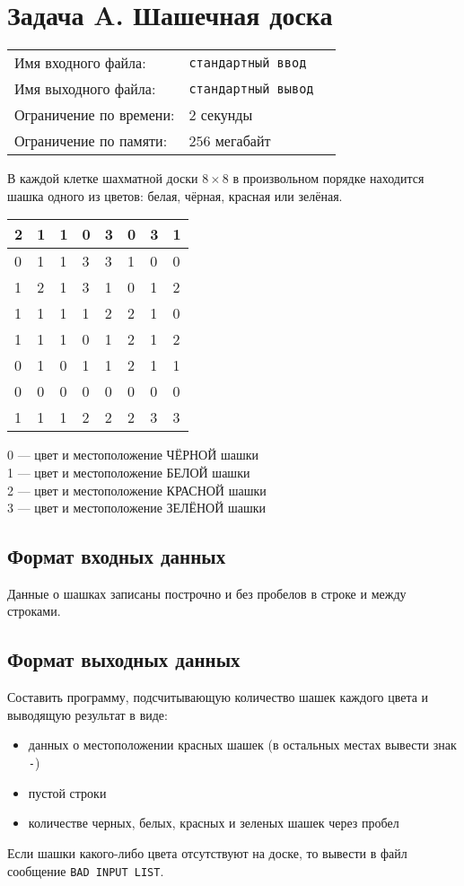 \documentclass[11pt]{scrartcl}
\begin{document}
\section*{Задача A. Шашечная доска}

\begin{tabularx}{\textwidth}{l l X}
    Имя входного файла: & \texttt{стандартный ввод} \\
    Имя выходного файла: & \texttt{стандартный вывод} \\
    Ограничение по времени: & $2$ секунды \\
    Ограничение по памяти: & $256$ мегабайт \\
\end{tabularx}

В каждой клетке шахматной доски $8 \times 8$ в произвольном порядке находится шашка одного из цветов: белая, чёрная, красная или зелёная.

\begin{tabular}{| l | l | l | l | l | l | l | l |}
    \hline
    2 & 1 & 1 & 0 & 3 & 0 & 3 & 1 \\ \hline
    0 & 1 & 1 & 3 & 3 & 1 & 0 & 0 \\ \hline
    1 & 2 & 1 & 3 & 1 & 0 & 1 & 2 \\ \hline
    1 & 1 & 1 & 1 & 2 & 2 & 1 & 0 \\ \hline
    1 & 1 & 1 & 0 & 1 & 2 & 1 & 2 \\ \hline
    0 & 1 & 0 & 1 & 1 & 2 & 1 & 1 \\ \hline
    0 & 0 & 0 & 0 & 0 & 0 & 0 & 0 \\ \hline
    1 & 1 & 1 & 2 & 2 & 2 & 3 & 3 \\ \hline
\end{tabular}

0 --- цвет и местоположение ЧЁРНОЙ шашки \\
1 --- цвет и местоположение БЕЛОЙ шашки \\
2 --- цвет и местоположение КРАСНОЙ шашки \\
3 --- цвет и местоположение ЗЕЛЁНОЙ шашки \\


\subsection*{Формат входных данных}
Данные о шашках записаны построчно и без пробелов в строке и между строками.

\subsection*{Формат выходных данных}
Составить программу, подсчитывающую количество шашек каждого цвета и выводящую результат в виде:
\begin{itemize}
\item данных о местоположении красных шашек (в остальных местах вывести знак \texttt{-})
\item пустой строки
\item количестве черных, белых, красных и зеленых шашек через пробел
\end{itemize}
Если шашки какого-либо цвета отсутствуют на доске, то вывести в файл сообщение \texttt{BAD INPUT LIST}.
\end{document}
